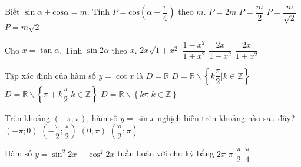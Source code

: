 \begin{ex}
	Biết $\sin \alpha +\text{cos}\alpha =m$. Tính $P=\text{cos}\left(\alpha -\dfrac{\pi }{4}\right)$ theo $m$.
	\choice
	{$P=2m$}
	{$P=\dfrac{m}{2}$}
	{\True $P=\dfrac{m}{\sqrt{2}}$}
	{$P=m\sqrt{2}$}
\end{ex}
\begin{ex}
	Cho $x=\tan \alpha $. Tính $\sin 2\alpha $ theo $x$.
	\choice
	{$2x\sqrt{1+x^2}$}
	{$\dfrac{1-x^2}{1+x^2}$}
	{$\dfrac{2x}{1-x^2}$}
	{\True $\dfrac{2x}{1+x^2}$}
\end{ex}
\begin{ex}
	Tập xác định của hàm số $y=\cot x$ là
	\choice
	{$D=\mathbb{R}$}
	{$D=\mathbb{R}\backslash \left\{ k\dfrac{\pi }{2}\left| k\in \mathbb{Z} \right. \right\}$}
	{$D=\mathbb{R}\backslash \left\{ \pi +k\dfrac{\pi }{2}\left| k\in \mathbb{Z} \right. \right\}$}
	{\True $D=\mathbb{R}\backslash \left\{ k\pi \left| k\in \mathbb{Z} \right. \right\}$}
\end{ex}
\begin{ex}
	Trên khoảng $\left(-\pi ;\pi\right)$, hàm số $y=\sin x$ nghịch biến trên khoảng nào sau đây?
	\choice
	{$\left(-\pi ;0\right)$}
	{$\left(-\dfrac{\pi }{2};\dfrac{\pi }{2}\right)$}
	{$\left(0;\pi\right)$}
	{\True $\left(\dfrac{\pi }{2};\pi\right)$}
\end{ex}
\begin{ex}
	Hàm số $y={{\sin }^2}2x-{{\cos }^2}2x$ tuần hoàn với chu kỳ bằng
	\choice
	{$2\pi $}
	{$\pi $}
	{\True $\dfrac{\pi }{2}$}
	{$\dfrac{\pi }{4}$}
\end{ex}
